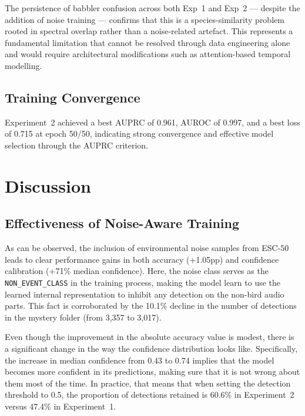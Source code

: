 \documentclass[conference]{IEEEtran}
\begin{document}
The persistence of babbler confusion across both Exp~1 and Exp~2 --- despite the addition of noise training --- confirms that this is a species-similarity problem rooted in spectral overlap rather than a noise-related artefact. This represents a fundamental limitation that cannot be resolved through data engineering alone and would require architectural modifications such as attention-based temporal modelling.

\subsection{Training Convergence}

Experiment~2 achieved a best AUPRC of 0.961, AUROC of 0.997, and a best loss of 0.715 at epoch 50/50, indicating strong convergence and effective model selection through the AUPRC criterion.

\section{Discussion}

\subsection{Effectiveness of Noise-Aware Training}

As can be observed, the inclusion of environmental noise samples from ESC-50 leads to clear performance gains in both accuracy (+1.05pp) and confidence calibration (+71\% median confidence). Here, the noise class serves as the \texttt{NON\_EVENT\_CLASS} in the training process, making the model learn to use the learned internal representation to inhibit any detection on the non-bird audio parts. This fact is corroborated by the 10.1\% decline in the number of detections in the mystery folder (from 3,357 to 3,017).

Even though the improvement in the absolute accuracy value is modest, there is a significant change in the way the confidence distribution looks like. Specifically, the increase in median confidence from 0.43 to 0.74 implies that the model becomes more confident in its predictions, making sure that it is not wrong about them most of the time. In practice, that means that when setting the detection threshold to 0.5, the proportion of detections retained is 60.6\% in Experiment~2 versus 47.4\% in Experiment~1.
\end{document}
